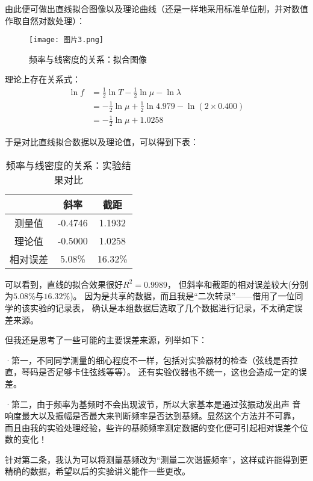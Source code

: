 \documentclass[11pt]{article}
\begin{document}
由此便可做出直线拟合图像以及理论曲线（还是一样地采用标准单位制，并对数值作取自然对数处理）：
\begin{figure}[H]
    \centering
    \texttt{[image: 图片3.png]}
    \caption{频率与线密度的关系：拟合图像}
\end{figure}

理论上存在关系式：
\begin{align*}
    \ln f&=\frac{1}{2}\ln T-\frac{1}{2}\ln \mu-\ln\lambda\\
    &=-\frac{1}{2}\ln \mu+\frac{1}{2}\ln 4.979-\ln(2\times 0.400)\\
    &=-\frac{1}{2}\ln \mu+1.0258
\end{align*}

于是对比直线拟合数据以及理论值，可以得到下表：
\begin{table}[H]
    \centering
    \caption{频率与线密度的关系：实验结果对比}
    \begin{tabular}{ccc}
        \toprule
         ~&斜率 & 截距 \\ 
         \midrule
        测量值 & -0.4746 & 1.1932 \\ 
        理论值 & -0.5000 & 1.0258 \\ 
        相对误差 & 5.08\% & 16.32\% \\ 
        \bottomrule
    \end{tabular}
\end{table}

可以看到，直线的拟合效果很好$R^2=0.9989$，
但斜率和截距的相对误差较大(分别为$5.08\%$与$16.32\%$)。
因为是共享的数据，而且我是“二次转录”——借用了一位同学的该实验的记录表，
确认是本组数据后选取了几个数据进行记录，不太确定误差来源。

但我还是思考了一些可能的主要误差来源，列举如下：

·第一，不同同学测量的细心程度不一样，包括对实验器材的检查（弦线是否拉直，琴码是否足够卡住弦线等等）。
还有实验仪器也不统一，这也会造成一定的误差。

·第二，由于频率为基频时不会出现波节，所以大家基本是通过弦振动发出声
音响度最大以及振幅是否最大来判断频率是否达到基频。显然这个方法并不可靠，
而且由我的实验处理经验，些许的基频频率测定数据的变化便可引起相对误差个位数的变化！



针对第二条，我认为可以将测量基频改为“测量二次谐振频率”，这样或许能得到更精确的数据，希望以后的实验讲义能作一些更改。
\end{document}

